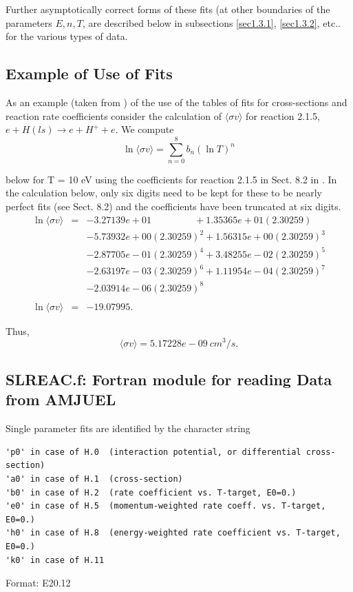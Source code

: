 \documentclass[12pt,dvipdfmx]{article}
\begin{document}
Further asymptotically correct forms of these fits (at other boundaries of the parameters $E, n, T$, are described below
in subsections \ref{sec1.3.1}, \ref{sec1.3.2}, etc.. for the various types of data.

\subsection{Example of Use of Fits}\label{sec1.1}

As an example (taken from \cite{kn:Janev}) of the use of the tables of fits for cross-sections and reaction rate coefficients consider
the calculation of $\langle\sigma v\rangle$ for reaction 2.1.5, $e + H(ls) \rightarrow e + H^+ + e$. We compute\\

      $$\ln \langle\sigma v\rangle = \sum_{n=0}^8 b_n(\ln T)^n$$

below for T = 10 eV using the coefficients for reaction 2.1.5 in Sect. 8.2 in \cite{kn:Janev}. In the calculation below, only
six digits need to be kept for these to be nearly perfect fits (see Sect. 8.2) and the coefficients have
been truncated at six digits.\\

\begin{eqnarray*}
\ln \langle\sigma v\rangle & = & -3.27139e+01 \quad\quad\quad\quad \ \ + 1.35365e+01 (2.30259)\\
& & -5.73932e+00 (2.30259)^2 + 1.56315e+00 (2.30259)^3\\
& & -2.87705e-01 (2.30259)^4 + 3.48255e-02 (2.30259)^5\\
& & -2.63197e-03 (2.30259)^6 + 1.11954e-04 (2.30259)^7\\
& & -2.03914e-06 (2.30259)^8\\
\\
\ln \langle\sigma v\rangle & = & -19.07995.
\end{eqnarray*}


Thus,\\

$$\langle\sigma v\rangle = 5.17228e-09  \ cm^3/s.$$
\subsection{SLREAC.f: Fortran module for reading Data from AMJUEL}\label{sec1.2}
Single parameter fits are identified by the character string
\begin{small}\begin{verbatim}
'p0' in case of H.0  (interaction potential, or differential cross-section)
'a0' in case of H.1  (cross-section)
'b0' in case of H.2  (rate coefficient vs. T-target, E0=0.)
'e0' in case of H.5  (momentum-weighted rate coeff. vs. T-target, E0=0.)
'h0' in case of H.8  (energy-weighted rate coefficient vs. T-target, E0=0.)
'k0' in case of H.11
\end{verbatim}\end{small}
Format: E20.12
\end{document}
